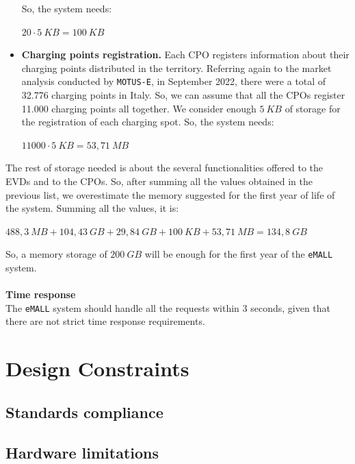\begin{itemize}
    So, the system needs:
    \begin{center}
        $20\cdot 5\ KB = 100\ KB$
    \end{center}
    \item \textbf{Charging points registration.} Each CPO registers information about their charging points distributed in the territory.
    Referring again to the market analysis conducted by \verb|MOTUS-E|, in September 2022,
    there were a total of 32.776 charging points in Italy.
    So, we can assume that all the CPOs register 11.000 charging points all together.
    We consider enough $5\ KB$ of storage for the registration of each charging spot.
    So, the system needs:
    \begin{center}
        $11 000\cdot 5\ KB = 53,71\ MB$
    \end{center}
\end{itemize}
The rest of storage needed is about the several functionalities offered to the EVDs and to the CPOs.
So, after summing all the values obtained in the previous list, we overestimate the memory suggested for the first year
of life of the system.
Summing all the values, it is:
\begin{center}
    $488,3\ MB + 104,43\ GB + 29,84\ GB + 100\ KB + 53,71\ MB = 134,8\ GB$
\end{center}
So, a memory storage of $200\ GB$ will be enough for the first year of the \verb|eMALL| system. \\
\\
\textbf{Time response} \\
The \verb|eMALL| system should handle all the requests within 3 seconds, given that there are not strict time response requirements.



\section{Design Constraints}
\label{sec:design_constraints}%

\subsection{Standards compliance}
\label{subsec:standards_compliance}%

\subsection{Hardware limitations}
\label{subsec:hardware_limitations}%

